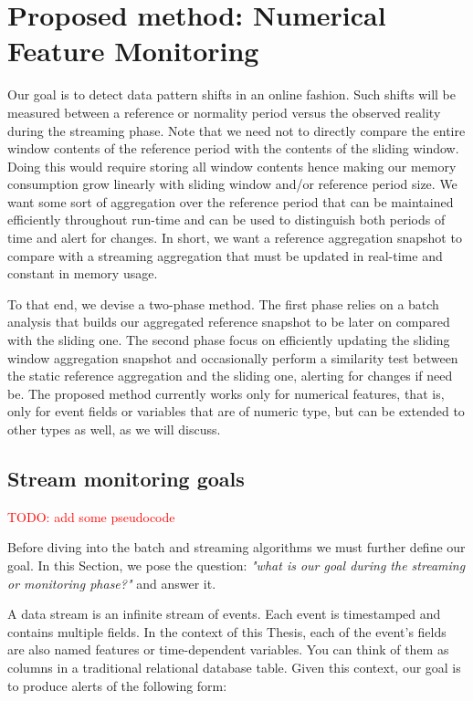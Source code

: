 \section{Proposed method: Numerical Feature Monitoring}

Our goal is to detect data pattern shifts in an online fashion. Such shifts will be measured between a reference or normality period versus the observed reality during the streaming phase. Note that we need not to directly compare the entire window contents of the reference period with the contents of the sliding window. Doing this would require storing all window contents hence making our memory consumption grow linearly with sliding window and/or reference period size. We want some sort of aggregation over the reference period that can be maintained efficiently throughout run-time and can be used to distinguish both periods of time and alert for changes. In short, we want a reference aggregation snapshot to compare with a streaming aggregation that must be updated in real-time and constant in memory usage.

To that end, we devise a two-phase method. The first phase relies on a batch analysis that builds our aggregated reference snapshot to be later on compared with the sliding one. The second phase focus on efficiently updating the sliding window aggregation snapshot and occasionally perform a similarity test between the static reference aggregation and the sliding one, alerting for changes if need be. The proposed method currently works only for numerical features, that is, only for event fields or variables that are of numeric type, but can be extended to other types as well, as we will discuss.

\subsection{Stream monitoring goals}
\textcolor{red}{TODO: add some pseudocode}

Before diving into the batch and streaming algorithms we must further define our goal. In this Section, we pose the question: \textit{"what is our goal during the streaming or monitoring phase?"} and answer it.

A data stream is an infinite stream of events. Each event is timestamped and contains multiple fields. In the context of this Thesis, each of the event's fields are also named features or time-dependent variables. You can think of them as columns in a traditional relational database table. Given this context, our goal is to produce alerts of the following form:

